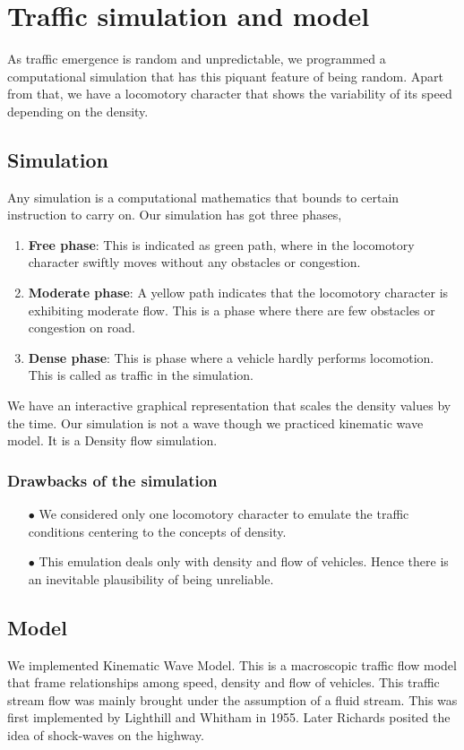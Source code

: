 \documentclass[12pt,a4paper]{report}
\begin{document}
	\section*{Traffic simulation and model}
	As traffic emergence is random and unpredictable, we programmed a computational simulation that has this piquant feature of being random. Apart from that, we have a locomotory character that shows the variability of its speed depending on the density.
	\subsection*{Simulation}
	Any simulation is a computational mathematics that bounds to certain instruction to carry on. Our simulation has got three phases,
	\begin{enumerate}
		\item \textbf{Free phase}: This is indicated as green path, where in the locomotory character swiftly moves without any obstacles or congestion.
		\item \textbf{Moderate phase}: A yellow path indicates that the locomotory character is exhibiting moderate flow. This is a phase where there are few obstacles or congestion on road.
		\item \textbf{Dense phase}: This is phase where a vehicle hardly performs locomotion. This is called as traffic in the simulation.
	\end{enumerate}
	We have an interactive graphical representation that scales the density values by the time. Our simulation is not a wave though we practiced kinematic wave model. It is a Density flow simulation.
	\subsubsection*{Drawbacks of the simulation}
	\begin{itemize}
		\item[$\bullet$] We considered only one locomotory character to emulate the traffic conditions centering to the concepts of density.
		\item[$\bullet$] This emulation deals only with density and flow of vehicles. Hence there is an inevitable plausibility of being unreliable.
	\end{itemize}
	\subsection*{Model}
	We implemented Kinematic Wave Model. This is a macroscopic traffic flow model that frame relationships among speed, density and flow of vehicles. This traffic stream flow was mainly brought under the assumption of a fluid stream. This was first implemented by Lighthill and Whitham in 1955. Later Richards posited the idea of shock-waves on the highway.
\end{document}
